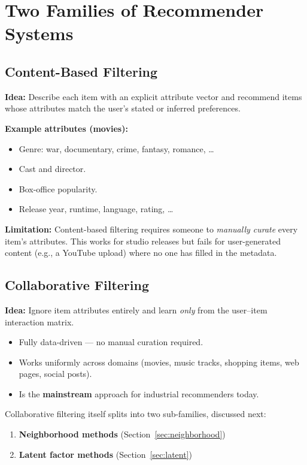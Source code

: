 \documentclass[11pt]{article}
\begin{document}
\section{Two Families of Recommender Systems}

\subsection{Content-Based Filtering}
\textbf{Idea:} Describe each item with an explicit attribute vector and recommend items whose attributes match the user's stated or inferred preferences.

\textbf{Example attributes (movies):}
\begin{itemize}
    \item Genre: war, documentary, crime, fantasy, romance, \ldots
    \item Cast and director.
    \item Box-office popularity.
    \item Release year, runtime, language, rating, \ldots
\end{itemize}

\textbf{Limitation:} Content-based filtering requires someone to \emph{manually curate} every item's attributes. This works for studio releases but fails for user-generated content (e.g., a YouTube upload) where no one has filled in the metadata.

\subsection{Collaborative Filtering}
\textbf{Idea:} Ignore item attributes entirely and learn \emph{only} from the user--item interaction matrix.

\begin{itemize}
    \item Fully data-driven --- no manual curation required.
    \item Works uniformly across domains (movies, music tracks, shopping items, web pages, social posts).
    \item Is the \textbf{mainstream} approach for industrial recommenders today.
\end{itemize}

Collaborative filtering itself splits into two sub-families, discussed next:
\begin{enumerate}
    \item \textbf{Neighborhood methods} (Section~\ref{sec:neighborhood})
    \item \textbf{Latent factor methods} (Section~\ref{sec:latent})
\end{enumerate}
\end{document}
